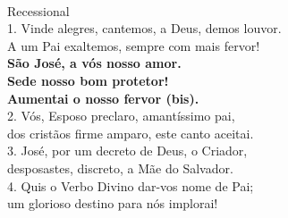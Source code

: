 \documentclass{book}
\begin{document}
\begin{flushleft}
    \vspace{.2cm} \\
    \textcolor{VioletRed2}{Recessional}
    \vspace{.2cm} \\
    1. Vinde alegres, cantemos, a Deus, demos louvor.  \\
    A um Pai exaltemos, sempre com mais fervor!
    \vspace{.2cm} \\
    \textbf{São José, a vós nosso amor. \\
        Sede nosso bom protetor! \\
        Aumentai o nosso fervor (bis).}
    \vspace{.2cm} \\
    2. Vós, Esposo preclaro, amantíssimo pai, \\
    dos cristãos firme amparo, este canto aceitai. \\
    3. José, por um decreto de Deus, o Criador, \\
    desposastes, discreto, a Mãe do Salvador. \\
    4. Quis o Verbo Divino dar-vos nome de Pai; \\
    um glorioso destino para nós implorai!
\end{flushleft}
\end{document}
